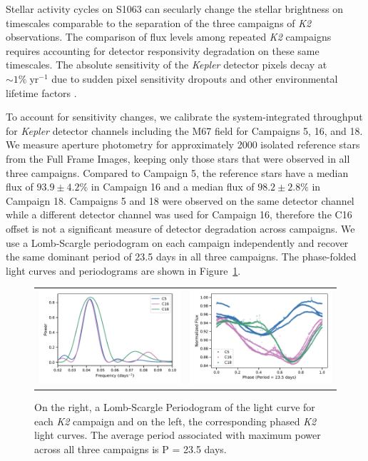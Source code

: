 \documentclass[trackchanges]{aastex631}
\begin{document}
Stellar activity cycles on S1063 can secularly change the stellar brightness on timescales comparable to the separation of the three campaigns of \emph{K2} observations.  The comparison of flux levels among repeated \emph{K2} campaigns requires accounting for detector responsivity degradation on these same timescales.  The absolute sensitivity of the \emph{Kepler} detector pixels decay at $\sim1 \%\;\textrm{yr}^{-1}$ due to sudden pixel sensitivity dropouts and other environmental lifetime factors \citep{montet17}.

To account for sensitivity changes, we calibrate the system-integrated throughput for \emph{Kepler} detector channels including the M67 field for Campaigns 5, 16, and 18. We measure aperture photometry for approximately 2000 isolated reference stars from the Full Frame Images, keeping only those stars that were observed in all three campaigns. Compared to Campaign 5, the reference stars have a median flux of $93.9\pm4.2\%$ in Campaign 16 and a median flux of $98.2\pm2.8\%$ in Campaign 18. Campaigns 5 and 18 were observed on the same detector channel while a different detector channel was used for Campaign 16, therefore the C16 offset is not a significant measure of detector degradation across campaigns. We use a Lomb-Scargle periodogram on each campaign independently and recover the same dominant period of 23.5 days in all three campaigns. The phase-folded light curves and periodograms are shown in Figure~\ref{fig:periodogram}.



\begin{figure}[ht]
    \centering
    \begin{tabular}{cc}
      \includegraphics[width=3in]{figures/AllCampaigns_Periodogram.pdf}   & \includegraphics[width=3in]{figures/AllCampaigns_Phased_Lightcurve.pdf}  \\
    \end{tabular}
    \caption{On the right, a Lomb-Scargle Periodogram of the light curve for each \emph{K2} campaign and on the left, the corresponding phased \emph{K2} light curves. The average period associated with maximum power across all three campaigns is P = 23.5 days.  }
    \label{fig:periodogram}
\end{figure}
\end{document}

